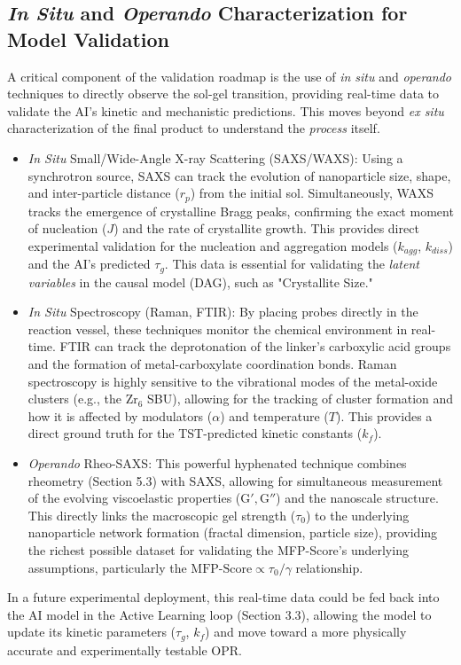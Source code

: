\documentclass[12pt,a4paper]{article}
\begin{document}
\subsection{\textit{In Situ} and \textit{Operando} Characterization for Model Validation}

A critical component of the validation roadmap is the use of \textit{in situ} and \textit{operando} techniques to directly observe the sol-gel transition, providing real-time data to validate the AI's kinetic and mechanistic predictions. This moves beyond \textit{ex situ} characterization of the final product to understand the \textit{process} itself.
\begin{itemize}
    \item \textit{In Situ} Small/Wide-Angle X-ray Scattering (SAXS/WAXS): Using a synchrotron source, SAXS can track the evolution of nanoparticle size, shape, and inter-particle distance ($r_p$) from the initial sol. Simultaneously, WAXS tracks the emergence of crystalline Bragg peaks, confirming the exact moment of nucleation ($J$) and the rate of crystallite growth. This provides direct experimental validation for the nucleation and aggregation models ($k_{agg}$, $k_{diss}$) and the AI's predicted $\tau_g$. This data is essential for validating the \textit{latent variables} in the causal model (DAG), such as "Crystallite Size."
    \item \textit{In Situ} Spectroscopy (Raman, FTIR): By placing probes directly in the reaction vessel, these techniques monitor the chemical environment in real-time. FTIR can track the deprotonation of the linker's carboxylic acid groups and the formation of metal-carboxylate coordination bonds. Raman spectroscopy is highly sensitive to the vibrational modes of the metal-oxide clusters (e.g., the $\text{Zr}_6$ SBU), allowing for the tracking of cluster formation and how it is affected by modulators ($\alpha$) and temperature ($T$). This provides a direct ground truth for the TST-predicted kinetic constants ($k_f$).\cite{ref53}
    \item \textit{Operando} Rheo-SAXS: This powerful hyphenated technique combines rheometry (Section 5.3) with SAXS, allowing for simultaneous measurement of the evolving viscoelastic properties ($\text{G}', \text{G}''$) and the nanoscale structure. This directly links the macroscopic gel strength ($\tau_0$) to the underlying nanoparticle network formation (fractal dimension, particle size), providing the richest possible dataset for validating the MFP-Score's underlying assumptions, particularly the $\text{MFP-Score} \propto \tau_0 / \gamma$ relationship.
\end{itemize}
In a future experimental deployment, this real-time data could be fed back into the AI model in the Active Learning loop (Section 3.3), allowing the model to update its kinetic parameters ($\tau_g$, $k_f$) and move toward a more physically accurate and experimentally testable OPR.
\end{document}
